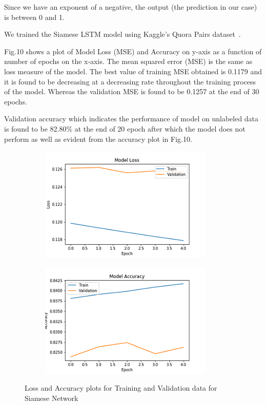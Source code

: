\documentclass[runningheads]{llncs}
\begin{document}
	Since we have an exponent of a negative, the output (the prediction in our case) is between 0 and 1.
	
	We trained the Siamese LSTM model using Kaggle's Quora Pairs dataset~\cite{ref_url14}. 	
	
	Fig.10 shows a plot of Model Loss (MSE) and Accuracy on y-axis as a function of number of epochs on the x-axis.
	The mean squared error (MSE) is the same as loss measure of the model. The best value of training MSE obtained is 0.1179 and it is found to be decreasing at a decreasing rate throughout the training process of the model. Whereas the validation MSE is found to be 0.1257 at the end of 30 epochs.
	
	Validation accuracy which indicates the performance of model on unlabeled data is found to be 82.80\% at the end of 20 epoch after which the model does not perform as well as evident from the accuracy plot in Fig.10.
	
	\begin{figure}[H]
		\begin{subfigure}[b]{0.51\textwidth}
			\includegraphics[width=\textwidth]{siamese_eng_loss.png}
			\label{fig:Model Loss}
		\end{subfigure}
		\hfill
		\begin{subfigure}[b]{0.51\textwidth}
			\includegraphics[width=\textwidth]{siamese_eng_acc.png}
			\label{fig:Model Accuracy}
		\end{subfigure}
		\caption{Loss and Accuracy plots for Training and Validation data for Siamese Network}
	\end{figure}
	
\end{document}
